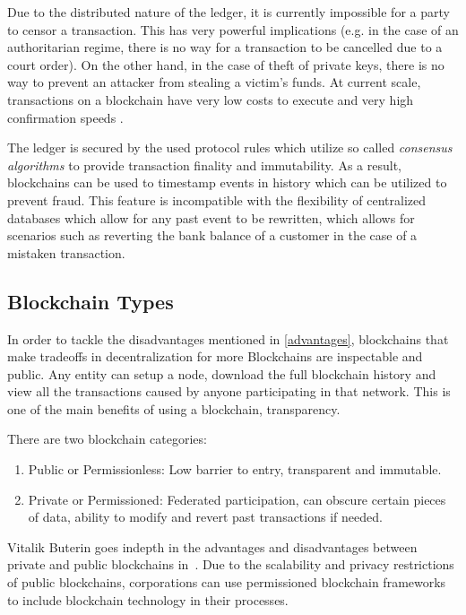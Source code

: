 Due to the distributed nature of the ledger, it is currently impossible for a party to censor a transaction. This has very powerful implications (e.g. in the case of an authoritarian regime, there is no way for a transaction to be cancelled due to a court order). On the other hand, in the case of theft of private keys, there is no way to prevent an attacker from stealing a victim's funds.  At current scale, transactions on a blockchain have very low costs to execute and very high confirmation speeds \cite{ethpricestats}.

The ledger is secured by the used protocol rules which utilize so called \textit{consensus algorithms}\cite{consensus_algo} to provide transaction finality and immutability. As a result, blockchains can be used to timestamp events in history \cite{ots} which can be utilized to prevent fraud. This feature is incompatible with the flexibility of centralized databases which allow for any past event to be rewritten, which allows for scenarios such as reverting the bank balance of a customer in the case of a mistaken transaction. 

\subsection{Blockchain Types}
In order to tackle the disadvantages mentioned in \ref{advantages}, blockchains that make tradeoffs in decentralization for more 
Blockchains are inspectable and public. Any entity can setup a node, download the full blockchain history and view all the transactions caused by anyone participating in that network. This is one of the main benefits of using a blockchain, transparency.

There are two blockchain categories:
\begin{enumerate}
    \item Public or Permissionless: Low barrier to entry, transparent and immutable.
    \item Private or Permissioned: Federated participation, can obscure certain pieces of data, ability to modify and revert past transactions if needed.
\end{enumerate}

Vitalik Buterin goes indepth in the advantages and disadvantages between private and public blockchains in~\cite{publicprivate}. Due to the scalability and privacy restrictions of public blockchains, corporations can use permissioned blockchain frameworks~\cite{quorum, hyperledger, r3} to include blockchain technology in their processes.

